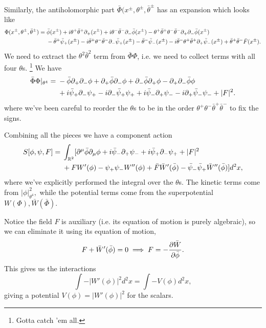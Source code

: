 Similarly, the antiholomorphic part $\bar \Phi(x^\pm, \theta^\pm, \bar \theta^\pm$ has an expansion which looks like
\begin{align*}
    \Phi(x^\pm, \theta^\pm, \bar \theta^\pm) 
        ={}& \bar \phi(x^\pm) + i\theta^+ \bar \theta^+ \p_+ (x^\pm) + i\theta^- \bar \theta^- \p_- \bar \phi(x^\pm) - \theta^+ \bar \theta^+ \theta^- \bar \theta^- \p_+ \p_- \bar \phi(x^\pm)\\
        &- \bar \theta^+ \bar \psi_+(x^\pm) -i\bar \theta^+ \theta^- \bar \theta^- \p_- \bar \psi_+ (x^\pm) -\bar \theta^- \bar \psi_- (x^\pm) - i\bar \theta^- \theta^+ \bar \theta^+ \p_+ \bar \psi_- (x^\pm) + \bar \theta^+ \bar \theta^- \bar F(x^\pm).
\end{align*}
We need to extract the $\theta^2 \bar \theta^2$ term from $\bar \Phi \Phi$, i.e. we need to collect terms with all four $\theta$s.%
    \footnote{Gotta catch 'em all.}
We have
\begin{align*}
    \bar \Phi \Phi|_{\theta^4} ={}& -\bar \phi \p_+ \p_- \phi + \p_+ \bar \phi \p_- \phi +\p_- \bar \phi \p_+ \phi -\p_+ \p_- \bar \phi \phi\\
    &+i\bar \psi_+ \p_- \psi_+ - i \p_- \bar \psi_+ \psi_+ + i\bar \psi_- \p_+ \psi_- -i\p_+ \bar \psi_- \psi_- + |F|^2.
\end{align*}
where we've been careful to reorder the $\theta$s to be in the order $\theta^+ \theta^- \bar \theta^+ \bar \theta^-$ to fix the signs.

Combining all the pieces we have a component action
\begin{align}
    S[\phi,\psi,F] ={}& \int_{\RR^2} [\p^\mu \bar \phi \p_\mu \phi + i \bar \psi_- \p_+ \psi_- + i\bar \psi_+ \p_- \psi_+ + |F|^2 \nonumber \\
    &+ FW'(\phi)-\psi_+ \psi_- W''(\phi) + \bar F \bar W'(\bar \phi) -\bar \psi_- \bar \psi_+ \bar W''(\bar \phi)] d^2x,\label{wzcomponentaction}
\end{align}
where we've explicitly performed the integral over the $\theta$s. The kinetic terms come  from $|\phi|^2_{\theta^4},$ while the potential terms come from the superpotential $W(\Phi), \bar W(\bar \Phi).$

Notice the field $F$ is auxiliary (i.e. its equation of motion is purely algebraic), so we can eliminate it using its equation of motion,
\begin{equation}
    F+\bar W'(\bar \phi)=0 \implies F=-\P{\bar W}{\bar \phi}.
\end{equation}
This gives us the interactions
\begin{equation}
    \int -|W'(\phi)|^2 d^2x = \int -V(\phi)d^2x,
\end{equation}
giving a potential $V(\phi)=|W'(\phi)|^2$ for the scalars.

